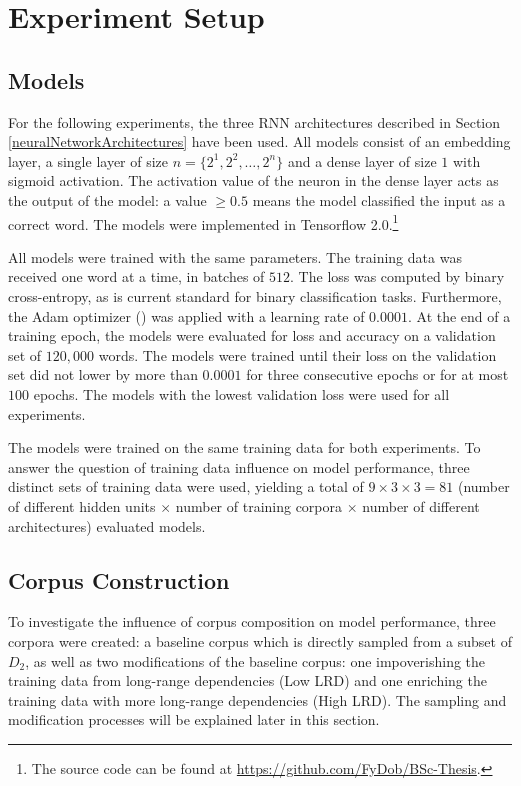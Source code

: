 \section{Experiment Setup}\label{ch:experimentSetup}
\subsection{Models}\label{models}
For the following experiments, the three RNN architectures described in Section \ref{neuralNetworkArchitectures} have been used. All models consist of an embedding layer, a single layer of size $n = \lbrace 2^{1}, 2^{2}, \dots, 2^{n} \rbrace$ and a dense layer of size $1$ with sigmoid activation. The activation value of the neuron in the dense layer acts as the output of the model: a value $\geq 0.5$ means the model classified the input as a correct word. The models were implemented in Tensorflow 2.0.\footnote{The source code can be found at \url {https://github.com/FyDob/BSc-Thesis}.}

All models were trained with the same parameters. The training data was received one word at a time, in batches of $512$. The loss was computed by binary cross-entropy, as is current standard for binary classification tasks. Furthermore, the Adam optimizer (\cite{Kingma2014}) was applied with a learning rate of $0.0001$. At the end of a training epoch, the models were evaluated for loss and accuracy on a validation set of $120{,}000$ words. The models were trained until their loss on the validation set did not lower by more than $0.0001$ for three consecutive epochs or for at most $100$ epochs. The models with the lowest validation loss were used for all experiments.

The models were trained on the same training data for both experiments. To answer the question of training data influence on model performance, three distinct sets of training data were used, yielding a total of $9 \times 3 \times 3 = 81$ (number of different hidden units $\times$ number of training corpora $\times$ number of different architectures) evaluated models.

\subsection{Corpus Construction}\label{corpusConstruction}
To investigate the influence of corpus composition on model performance, three corpora were created: a baseline corpus which is directly sampled from a subset of $D_{2}$, as well as two modifications of the baseline corpus: one impoverishing the training data from long-range dependencies (Low LRD) and one enriching the training data with more long-range dependencies (High LRD). The sampling and modification processes will be explained later in this section.

